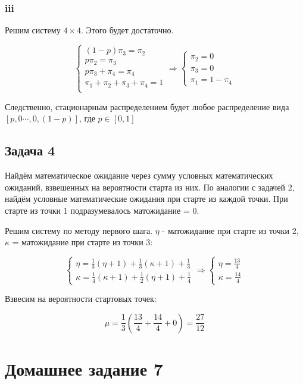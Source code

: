 \documentclass[a4paper,12pt]{article}
\begin{document}
\subsubsection{iii}

Решим систему $ 4 \times 4 $. Этого будет достаточно.

\[ \begin{cases}
(1-p)\pi_3 = \pi_2\\
p\pi_2 = \pi_3\\
p\pi_3 + \pi_4 = \pi_4\\
\pi_1 + \pi_2 + \pi_3 + \pi_4 = 1\\
\end{cases} \Rightarrow 
\begin{cases}
\pi_2 = 0\\
\pi_3 = 0\\
\pi_1 = 1 - \pi_4
\end{cases} \]

Следственно, стационарным распределением будет любое распределение вида $ [p, 0 \cdots, 0, (1-p)] $, где $ p \in [0,1] $

\subsection{Задача 4}
Найдём математическое ожидание через сумму условных математических ожиданий, взвешенных на вероятности старта из них. По аналогии с задачей 2, найдём условные математические ожидания при старте из каждой точки. При старте из точки 1 подразумевалось матожидание = 0.

Решим систему по методу первого шага. $ \eta $ - матожидание при старте из точки 2, $ \kappa $ = матожидание при старте из точки 3:

\[ \begin{cases}
\eta = \frac{1}{3}(\eta + 1) + \frac{1}{3}(\kappa + 1) + \frac{1}{3}\\
\kappa = \frac{1}{4}(\kappa + 1)+ \frac{1}{2}(\eta + 1) +\frac{1}{4} 
\end{cases} \Rightarrow \begin{cases}
\eta = \frac{13}{4}\\
\kappa = \frac{14}{4}
\end{cases} \]

Взвесим на вероятности стартовых точек:

\[ \mu = \frac{1}{3}\left( \frac{13}{4} + \frac{14}{4} + 0 \right)  = \frac{27}{12}\]



\section{Домашнее задание 7}
\end{document}
